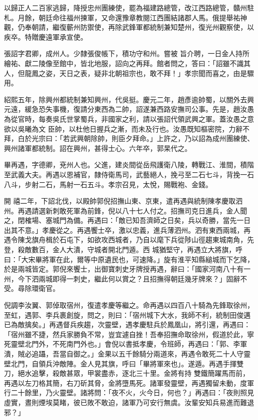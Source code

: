 \begin{pinyinscope}
 以歸正人二百家逃歸，降授忠州團練使，罷為福建路總管，改江西路總管，贛州駐札。月餘，朝廷命往福州揀軍，又命還豫章教閱江西團結諸郡人馬。俄提舉祐神觀，仍奉朝請，繼復蘄州防禦使，再除武鋒軍都統制兼知楚州，復光州觀察使，以疾卒。特贈慶遠軍承宣使。



 張詔字君卿，成州人。少隸張俊帳下，積功守和州。嘗被
 旨介聘，一日金人持所繪祐、獻二陵像至館中，皆北地服，詔向之再拜。館者問之，答曰：「詔雖不識其人，但龍鳳之姿，天日之表，疑非北朝祖宗也，敢不拜！」孝宗聞而喜之，由是驟用。



 紹熙五年，除興州都統制兼知興州，代吳挺。慶元二年，趙彥逾帥蜀，以關外去興元遠，緩急恐失事機，復請分東西為二帥，詔遂兼西路安撫司公事。先是，趙汝愚為從官時，每奏吳氏世掌蜀兵，非國家之利，請以張詔代領武興之軍。蓋汝愚之意欲以吳曦為文
 臣帥，以杜他日握兵之漸，而未及行也。汝愚既知樞密院，力辭不拜，白於光宗曰：「若武興朝除帥，則臣夕拜命。」上許之，乃以詔為成州團練使、興州諸軍都統制。詔在興州，甚得士心。六年卒，郭杲代之。



 畢再遇，字德卿，兗州人也。父進，建炎間從岳飛護衛八陵，轉戰江、淮間，積階至武義大夫。再遇以恩補官，隸侍衛馬司，武藝絕人，挽弓至二石七斗，背挽一石八斗，步射二石，馬射一石五斗。孝宗召見，太悅，賜戰袍、金錢。



 開
 禧二年，下詔北伐，以殿帥郭倪招撫山東、京東，遣再遇與統制陳孝慶取泗州。再遇請選新刺敢死軍為前鋒，倪以八十七人付之。招撫司克日進兵，金人聞之，閉榷場、塞城門為備。再遇曰：「敵已知吾濟師之日矣，兵以奇勝，當先一日出其不意。」孝慶從之。再遇饗士卒，激以忠義，進兵薄泗州。泗有東西兩城，再遇令陳戈旗舟楫於石屯下，如欲攻西城者，乃自以麾下兵從陟山徑趨東城南角，先登，殺敵數百，金人大潰，守城者開北門遁。西
 城猶堅守，再遇立大將旗，呼曰：「大宋畢將軍在此，爾等中原遺民也，可速降。」旋有淮平知縣縋城而下乞降，於是兩城皆定。郭倪來饗士，出御寶刺史牙牌授再遇，辭曰：「國家河南八十有一州，今下泗兩城即得一刺史，繼此何以賞之？且招撫得朝廷幾牙牌來？」固辭不受。尋除環衛官。



 倪調李汝翼、郭倬取宿州，復遣孝慶等繼之。命再遇以四百八十騎為先鋒取徐州，至虹，遇郭、李兵裹創旋，問之，則曰：「宿州城下大水，我師不利，統制田俊邁
 已為敵擒矣。」再遇督兵疾趨，次靈壁，遇孝慶駐兵於鳳凰山，將引還，再遇曰：「宿州雖不捷，然兵家勝負不常，豈宜遽自挫！吾奉招撫命取徐州，假道於此，寧死靈壁北門外，不死南門外也。」會倪以書抵孝慶，令班師，再遇曰：「郭、李軍潰，賊必追躡，吾當自御之。」金果以五千餘騎分兩道來，再遇令敢死二十人守靈壁北門，自領兵沖敵陣。金人見其旗，呼曰「畢將軍來也」。遂遁。再遇手揮雙刀，絕水追擊，殺敵甚眾，甲裳盡赤，逐北三十里。金將有持
 雙鐵簡躍馬而前，再遇以左刀格其簡，右刀斫其脅，金將墮馬死。諸軍發靈壁，再遇獨留未動，度軍行二十餘里，乃火靈壁。諸將問：「夜不火，火今日，何也？」再遇曰：「夜則照見虛實，晝則煙埃莫睹，彼已敗不敢迫，諸軍乃可安行無虞。汝輩安知兵易進而難退邪？」




\end{pinyinscope}
